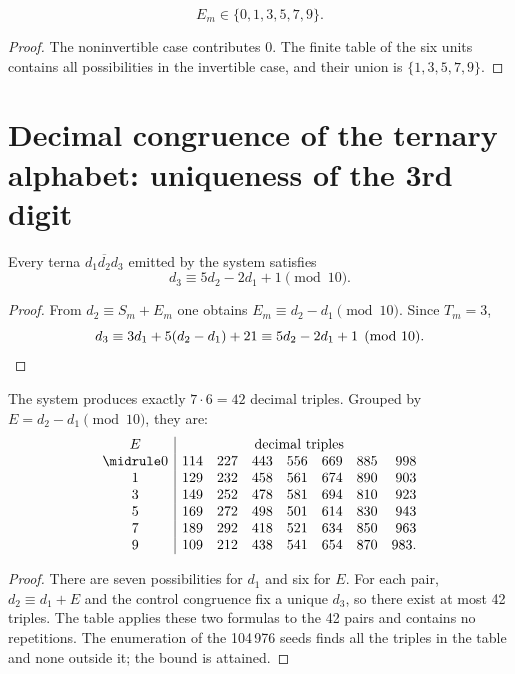 \begin{lemma}
\[
E_m\in\{0,1,3,5,7,9\}.
\]
\end{lemma}
\begin{proof}
The noninvertible case contributes \(0\). The finite table of the six units
contains all possibilities in the invertible case, and their union is
\(\{1,3,5,7,9\}\).
\end{proof}

\section{Decimal congruence of the ternary alphabet: uniqueness of the 3rd digit}

\begin{theorem}
Every terna \(\overline{d_1d_2d_3}\) emitted by the system satisfies
\[
\boxed{d_3\equiv5d_2-2d_1+1\pmod{10}.}
\]
\end{theorem}
\begin{proof}
From \(d_2\equiv S_m+E_m\) one obtains
\(E_m\equiv d_2-d_1\pmod{10}\). Since \(T_m=3\),
\[
d_3\equiv3d_1+5(d_2-d_1)+21
\equiv5d_2-2d_1+1\pmod{10}.\qedhere
\]
\end{proof}

\begin{theorem}
The system produces exactly \(7\cdot6=42\) decimal triples. Grouped by
\(E=d_2-d_1\pmod{10}\), they are:
\[
\begin{array}{c|rrrrrrr}
E&\multicolumn{7}{c}{\text{decimal triples}}\\
\midrule
0&114&227&443&556&669&885&998\\
1&129&232&458&561&674&890&903\\
3&149&252&478&581&694&810&923\\
5&169&272&498&501&614&830&943\\
7&189&292&418&521&634&850&963\\
9&109&212&438&541&654&870&983.
\end{array}
\]
\end{theorem}
\begin{proof}
There are seven possibilities for \(d_1\) and six for \(E\). For each pair,
\(d_2\equiv d_1+E\) and the control congruence fix a unique \(d_3\),
so there exist at most 42 triples. The table applies these two formulas
to the 42 pairs and contains no repetitions. The enumeration of the
104\,976 seeds finds all the triples in the table and none outside
it; the bound is attained.
\end{proof}

